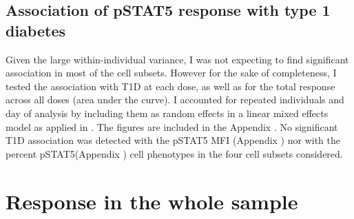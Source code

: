 

\subsection{Association of pSTAT5 response with type 1 diabetes}

Given the large within-individual variance, I was not expecting to find significant association in most of the cell subsets.
However for the sake of completeness, I tested the association with T1D at each dose, as well as for the total response across all doses (area under the curve).
I accounted for repeated individuals and day of analysis by including them as random effects in a linear mixed effects model as applied in .
The figures are included in the Appendix .
No significant T1D association was detected with the pSTAT5 MFI (Appendix ) nor with the percent pSTAT5\positive (Appendix ) cell phenotypes in the four cell subsets considered.

\section{Response in the whole sample}

